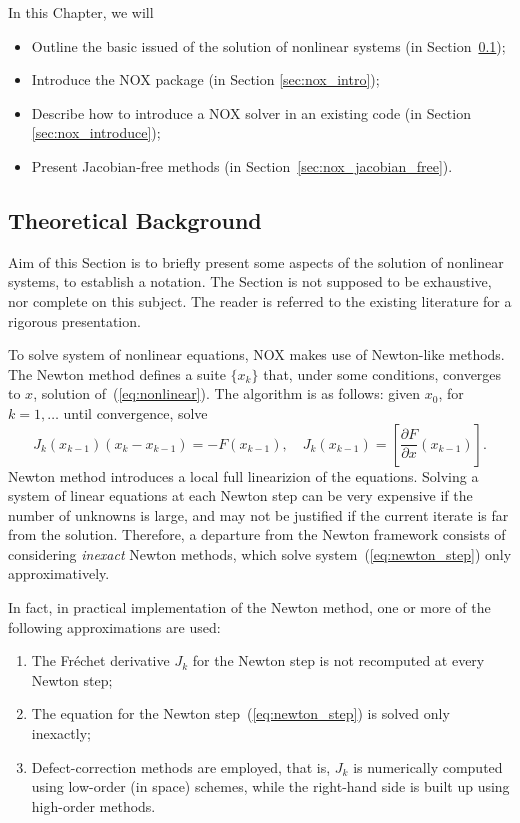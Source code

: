 In this Chapter, we will
\begin{itemize}
\item Outline the basic issued of the  solution of nonlinear
  systems (in Section~\ref{sec:nox_theoretical});
\item Introduce the NOX package (in Section \ref{sec:nox_intro});
\item Describe how to introduce a NOX solver in an existing code (in
  Section \ref{sec:nox_introduce});
\item Present Jacobian-free methods (in
  Section~\ref{sec:nox_jacobian_free}).
\end{itemize}


\subsection{Theoretical Background}
\label{sec:nox_theoretical}

Aim of this Section is to briefly present some aspects of the solution
of nonlinear systems, to establish a notation. The Section is not
supposed to be exhaustive, nor complete on this subject. The reader is
referred to the existing literature for a rigorous presentation.

\medskip

To solve system of nonlinear equations, NOX makes use of Newton-like methods.
The Newton method defines a suite $\{ x_k\}$ that, under some
conditions, converges to $x$, solution of~(\ref{eq:nonlinear}).
The algorithm is as follows: given $x_0$, for $k=1,\ldots$ until
convergence, solve
\begin{equation}
J_k  (x_{k-1})\left ( x_{k} - x_{k-1} \right) = 
- F(x_{k-1}),\quad
J_k  (x_{k-1}) =  \left[ \frac{ \partial F}{
        \partial x}( x_{k-1}) \right] .
\label{eq:newton_step}
\end{equation}
Newton method introduces a local full linearizion of the equations.
Solving a system of linear equations at each Newton step can be very
expensive if the number of unknowns is large, and may not be justified
if the current iterate is far from the solution. Therefore, a departure
from the Newton framework consists of considering {\em inexact} Newton
methods, which solve system~(\ref{eq:newton_step}) only approximatively.

In fact, in practical implementation of the Newton method, one or more
of the following approximations are used:
\begin{enumerate}
\item The Fr\'echet derivative $J_k$ for the Newton step is not
  recomputed at every Newton step;
\item The equation for the Newton step~(\ref{eq:newton_step}) is solved
  only inexactly;
\item Defect-correction methods are employed, that is, $J_k$ is
  numerically computed using low-order (in space) schemes, while the
  right-hand side is built up using high-order methods.
\end{enumerate}

